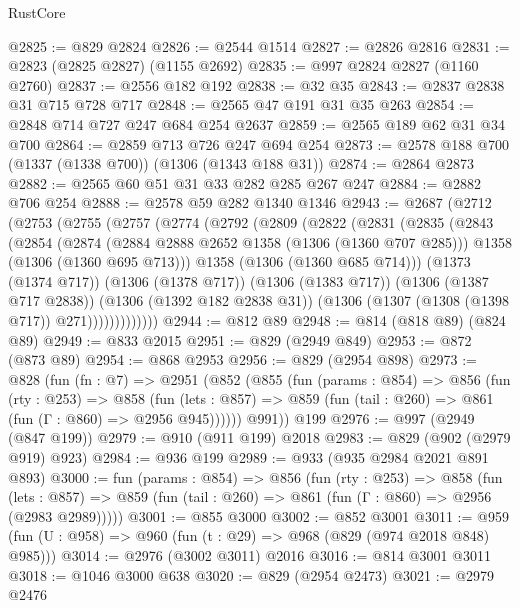 \begin{lexlean}{RustCore}
\begin{coremodule}
@2825 := @829 @2824
@2826 := @2544 @1514
@2827 := @2826 @2816
@2831 := @2823 (@2825 @2827) (@1155 @2692)
@2835 := @997 @2824 @2827 (@1160 @2760)
@2837 := @2556 @182 @192
@2838 := @32 @35
@2843 := @2837 @2838 @31 @715 @728 @717
@2848 := @2565 @47 @191 @31 @35 @263
@2854 := @2848 @714 @727 @247 @684 @254 @2637
@2859 := @2565 @189 @62 @31 @34 @700
@2864 := @2859 @713 @726 @247 @694 @254
@2873 := @2578 @188 @700 (@1337 (@1338 @700)) (@1306 (@1343 @188 @31))
@2874 := @2864 @2873
@2882 := @2565 @60 @51 @31 @33 @282 @285 @267 @247
@2884 := @2882 @706 @254
@2888 := @2578 @59 @282 @1340 @1346
@2943 := @2687
    (@2712
      (@2753
        (@2755
          (@2757
            (@2774
              (@2792
                (@2809
                  (@2822
                    (@2831
                      (@2835
                        (@2843
                          (@2854
                            (@2874
                              (@2884 @2888 @2652 @1358 (@1306 (@1360 @707 @285)))
                              @1358
                              (@1306 (@1360 @695 @713)))
                            @1358
                            (@1306 (@1360 @685 @714)))
                          (@1373 (@1374 @717))
                          (@1306 (@1378 @717))
                          (@1306 (@1383 @717))
                          (@1306 (@1387 @717 @2838))
                          (@1306 (@1392 @182 @2838 @31))
                          (@1306 (@1307 (@1308 (@1398 @717)) @271)))))))))))))
@2944 := @812 @89
@2948 := @814 (@818 @89) (@824 @89)
@2949 := @833 @2015
@2951 := @829 (@2949 @849)
@2953 := @872 (@873 @89)
@2954 := @868 @2953
@2956 := @829 (@2954 @898)
@2973 := @828
    (fun (fn : @7) =>
    @2951
      (@852
        (@855
          (fun (params : @854) =>
          @856
            (fun (rty : @253) =>
            @858
              (fun (lets : @857) =>
              @859 (fun (tail : @260) => @861 (fun (Γ : @860) => @2956 @945))))))
        @991))
    @199
@2976 := @997 (@2949 (@847 @199))
@2979 := @910 (@911 @199) @2018
@2983 := @829 (@902 (@2979 @919) @923)
@2984 := @936 @199
@2989 := @933 (@935 @2984 @2021 @891 @893)
@3000 := fun (params : @854) =>
  @856
    (fun (rty : @253) =>
    @858
      (fun (lets : @857) =>
      @859 (fun (tail : @260) => @861 (fun (Γ : @860) => @2956 (@2983 @2989)))))
@3001 := @855 @3000
@3002 := @852 @3001
@3011 := @959 (fun (U : @958) => @960 (fun (t : @29) => @968 (@829 (@974 @2018 @848) @985)))
@3014 := @2976 (@3002 @3011) @2016
@3016 := @814 @3001 @3011
@3018 := @1046 @3000 @638
@3020 := @829 (@2954 @2473)
@3021 := @2979 @2476

\end{coremodule}
\end{lexlean}
